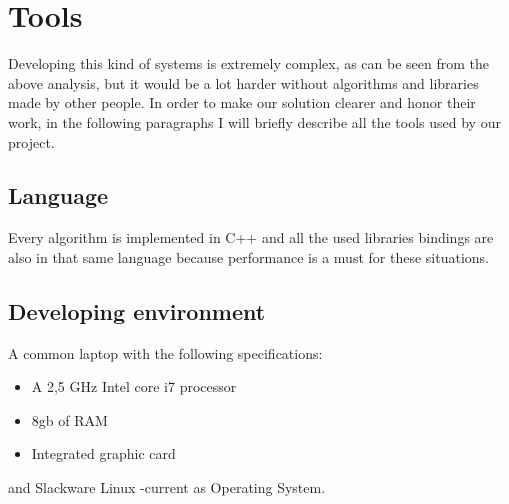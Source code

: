 \chapter{Tools}
\vspace{6cm}
Developing this kind of systems is extremely complex, as can be seen from the above analysis, but it would be a lot harder without algorithms and libraries made by other people.
In order to make our solution clearer and honor their work, in the following paragraphs I will briefly describe all the tools used by our project.
\newpage

\section{Language}
Every algorithm is implemented in C++ and all the used libraries bindings are also in that same language because performance is a must for these situations.   

\section{Developing environment}
A common laptop with the following specifications:
\begin{itemize}
  \item A 2,5 GHz Intel core i7 processor
  \item 8gb of RAM
  \item Integrated graphic card
\end{itemize}
and Slackware Linux -current as Operating System.


